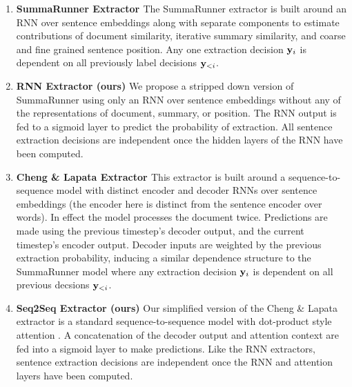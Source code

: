 \begin{enumerate}

    \item \textbf{SummaRunner Extractor \citep{nallapati2016summarunner}} 
      The SummaRunner extractor is built 
      around an RNN over sentence embeddings along 
      with separate components to estimate contributions of document 
      similarity, iterative summary similarity, and coarse and fine grained 
      sentence position. Any one extraction decision $\mathbf{y}_i$ is 
      dependent on all previously label decisions $\mathbf{y}_{<i}$.
  \item \textbf{RNN Extractor (ours)} We propose a stripped down version
      of SummaRunner using only an RNN over sentence embeddings 
      without any of the  representations of document, summary,
      or position. The RNN output is fed to a sigmoid layer to predict the
      probability of extraction. All sentence extraction decisions are
      independent once the hidden layers of the RNN have been computed. 
  \item \textbf{Cheng \& Lapata Extractor \citep{cheng2016neural}}
      This extractor is built around a sequence-to-sequence model with 
      distinct encoder and decoder RNNs over sentence embeddings (the encoder
      here is distinct from the sentence encoder over words).
      In effect the model processes the document twice. Predictions are 
      made using the previous timestep's decoder output, and the current 
      timestep's encoder output. Decoder inputs are weighted by the previous
      extraction probability, inducing a similar dependence structure 
      to the SummaRunner model where any extraction decision $\mathbf{y}_i$
      is dependent on all previous decsions $\mathbf{y}_{<i}$.
 \item \textbf{Seq2Seq Extractor (ours)} Our simplified version of the 
     Cheng \& Lapata extractor is a standard sequence-to-sequence model
     \citep{bahdanau2014neural} with dot-product style attention
     \citep{luong2015effective}. A concatenation of the decoder output and 
     attention context are fed into a sigmoid layer to make predictions.
     Like the RNN extractors, sentence extraction decisions are
      independent once the RNN and attention layers have been computed.
\end{enumerate}


